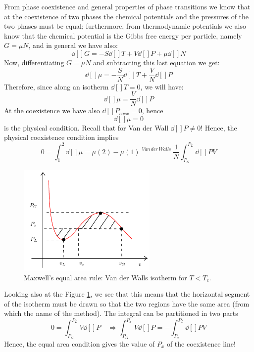 \documentclass[../../Main/Main.tex]{subfiles}
\begin{document}
From phase coexistence and general properties of phase transitions we know that at the coexistence of two phases the chemical potentials and the pressures of the two phases must be equal;  furthermore, from thermodynamic potentials we also know that the chemical potential is the Gibbs free energy per particle, namely \(G=\mu N \), and in general we have also:
\begin{equation*}
    \dd[]{G} = - S \dd[]{T} + V \dd[]{P} + \mu \dd[]{N}
\end{equation*}
Now, differentiating \(G=\mu N\) and subtracting this last equation we get:
\begin{equation*}
  \dd[]{\mu } = - \frac{S}{N} \dd[]{T} + \frac{V}{N} \dd[]{P}
\end{equation*}
Therefore, since along an isotherm  \( \dd[]{T}=0\), we will have:
\begin{equation*}
  \dd[]{\mu } = \frac{V}{N} \dd[]{P}
\end{equation*}
At the coexistence we have also \( \dd[]{P}_{coex}= 0  \), hence
\begin{equation*}
  \dd[]{\mu } = 0
\end{equation*}
is the physical condition.
Recall that for Van der Wall \( \dd[]{P} \neq 0  \)!
Hence, the physical coexistence condition implies
\begin{equation*}
  0 = \int_{1}^{2} \dd[]{\mu } = \mu (2) - \mu (1) \overset{Van\, der\, Walls}{=} \frac{1}{N} \int_{P_G}^{P_L} \dd[]{P} V
\end{equation*}
\begin{figure}[H]
\centering
\includegraphics[width=0.6\textwidth]{./img/5.pdf}
\caption{\label{fig:14_4} Maxwell's equal area rule: Van der Walls isotherm for \( T < T_c \).}
\end{figure}
Looking also at the Figure \ref{fig:14_4}, we see that this means that the horizontal segment of the isotherm must be drawn so that the two regions have the same area (from which the name of the method).
The integral can be partitioned in two parts
\begin{equation*}
  0 = \int_{P_G}^{P_L} V \dd[]{P} \quad \Rightarrow \int_{P_G}^{P_x} V\dd[]{P} = - \int_{P_x}^{P_L} \dd[]{P} V
\end{equation*}
Hence, the equal area condition gives the value of \( P_x \) of the coexistence line!
\end{document}
